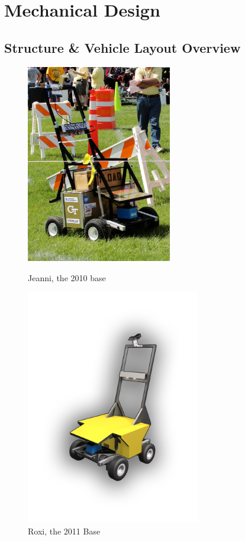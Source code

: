 \section{Mechanical Design}

\subsection{Structure \& Vehicle Layout Overview}

\begin{figure}[H]
\begin{minipage}[b]{0.5\linewidth}
\centering
\includegraphics[width=2.5in]{./pics/2010Jeanni.jpg}
\caption{Jeanni, the 2010 base}
\label{FIG:Jeanni}
\end{minipage}
\hspace{0.1in}
\begin{minipage}[b]{0.5\linewidth}
\centering
\includegraphics[width=3in]{./pics/RobotFrontCover.png}
\caption{Roxi, the 2011 Base}
\label{FIG:Trans}
\end{minipage}
\end{figure}

